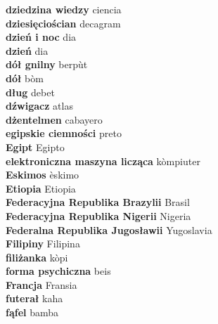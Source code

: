\textbf{ dziedzina wiedzy  } ciencia \\
\textbf{ dziesięciościan  } decagram \\
\textbf{ dzień i noc  } dia \\
\textbf{ dzień  } dia \\
\textbf{ dół gnilny  } berpùt \\
\textbf{ dół  } bòm \\
\textbf{ dług  } debet \\
\textbf{ dźwigacz  } atlas \\
\textbf{ dżentelmen  } cabayero \\
\textbf{ egipskie ciemności  } preto \\
\textbf{ Egipt  } Egipto \\
\textbf{ elektroniczna maszyna licząca  } kòmpiuter \\
\textbf{ Eskimos  } èskimo \\
\textbf{ Etiopia  } Etiopia \\
\textbf{ Federacyjna Republika Brazylii  } Brasil \\
\textbf{ Federacyjna Republika Nigerii  } Nigeria \\
\textbf{ Federalna Republika Jugosławii  } Yugoslavia \\
\textbf{ Filipiny  } Filipina \\
\textbf{ filiżanka  } kòpi \\
\textbf{ forma psychiczna  } beis \\
\textbf{ Francja  } Fransia \\
\textbf{ futerał  } kaha \\
\textbf{ fąfel  } bamba \\
